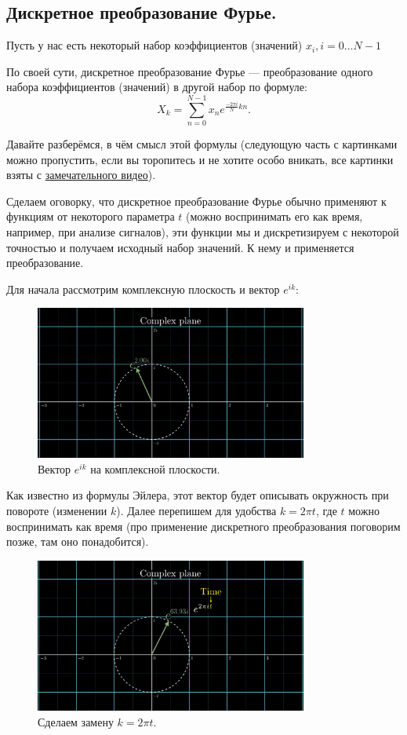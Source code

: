 \subsection{Дискретное преобразование Фурье.}
Пусть у нас есть некоторый набор коэффициентов (значений) $x_{i}, i = 0\ldots N - 1$

По своей сути, дискретное преобразование Фурье --- преобразование одного набора коэффициентов (значений) 
в другой набор по формуле:
\[
  X_{k} = \sum_{n=0}^{N - 1} x_{n} e^{\frac{-2\pi i}{N} kn}
.\] 

Давайте разберёмся, в чём смысл этой формулы (следующую часть с картинками можно пропустить, если вы
торопитесь и не хотите особо вникать, все картинки взяты с \href{https://www.youtube.com/watch?v=spUNpyF58BY}{замечательного видео}).

Сделаем оговорку, что дискретное преобразование Фурье обычно применяют к функциям от некоторого параметра
$t$ (можно воспринимать его как время, например, при анализе сигналов), эти функции мы и дискретизируем с
некоторой точностью и получаем исходный набор значений. К нему и применяется преобразование.

Для начала рассмотрим комплексную плоскость и вектор $e^{ik}$:
 \begin{figure}[H]    
  \centering    
  \includegraphics[width=0.8\textwidth]{figures/dft1.png}    
  \caption*{Вектор $e^{ik}$ на комплексной плоскости.}        
\end{figure} 

Как известно из формулы Эйлера, этот вектор будет описывать окружность при повороте (изменении $k$).
Далее перепишем для удобства $k = 2\pi t$, где $t$ можно воспринимать как время (про применение дискретного
преобразования поговорим позже, там оно понадобится).

\begin{figure}[H]    
  \centering    
  \includegraphics[width=0.8\textwidth]{figures/dft2.png}    
  \caption*{Сделаем замену $k = 2\pi t$.}        
\end{figure} 

